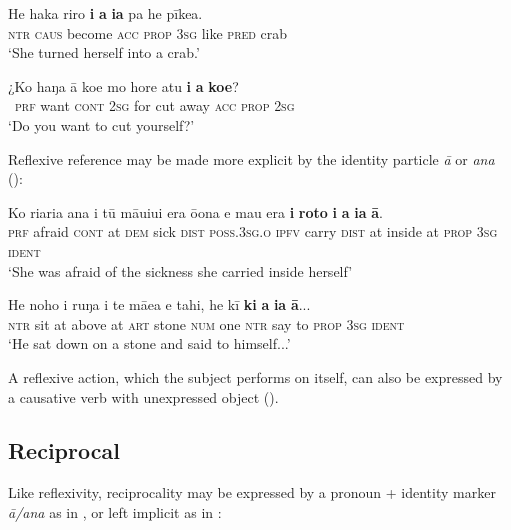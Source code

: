 \ea\label{ex:8.185}
\gll He haka riro \textbf{i} \textbf{a} \textbf{ia} pa he pīkea. \\
\textsc{ntr} \textsc{caus} become \textsc{acc} \textsc{prop} \textsc{3sg} like \textsc{pred} crab \\

\glt 
‘She turned herself into a crab.’ \textstyleExampleref{[R310.050]} 
\z

\ea\label{ex:8.186}
\gll ¿Ko haŋa {\ꞌ}ā koe mo hore atu \textbf{i} \textbf{a} \textbf{koe}? \\
~\textsc{prf} want \textsc{cont} \textsc{2sg} for cut away \textsc{acc} \textsc{prop} \textsc{2sg} \\

\glt
‘Do you want to cut yourself?’ \textstyleExampleref{[R428.009]} 
\z

Reflexive reference may be made more explicit by the identity particle \textit{{\ꞌ}ā} or \textit{{\ꞌ}ana} ():

\ea\label{ex:8.187}
\gll Ko ri{\ꞌ}ari{\ꞌ}a {\ꞌ}ana {\ꞌ}i tū māuiui era ō{\ꞌ}ona e ma{\ꞌ}u era  \textbf{{\ꞌ}i} \textbf{roto} \textbf{i} \textbf{a} \textbf{ia} \textbf{{\ꞌ}ā}.\\
\textsc{prf} afraid \textsc{cont} at \textsc{dem} sick \textsc{dist} \textsc{poss.3sg.o} \textsc{ipfv} carry \textsc{dist}  at inside at \textsc{prop} \textsc{3sg} \textsc{ident}\\

\glt 
‘She was afraid of the sickness she carried inside herself’ \textstyleExampleref{[R301.091]} 
\z

\ea\label{ex:8.188}
\gll He noho {\ꞌ}i ruŋa i te mā{\ꞌ}ea e tahi, he kī \textbf{ki} \textbf{a} \textbf{ia} \textbf{{\ꞌ}ā}...\\
\textsc{ntr} sit at above at \textsc{art} stone \textsc{num} one \textsc{ntr} say to \textsc{prop} \textsc{3sg} \textsc{ident}\\

\glt
‘He sat down on a stone and said to himself...’ \textstyleExampleref{[R229.365]} 
\z

A reflexive action, which the subject performs on itself, can also be expressed by a causative verb with unexpressed object ().

\subsection{Reciprocal}
Like reflexivity, reciprocality may be expressed by a pronoun + identity marker \textit{{\ꞌ}ā/{\ꞌ}ana} as in , or left implicit as in :

